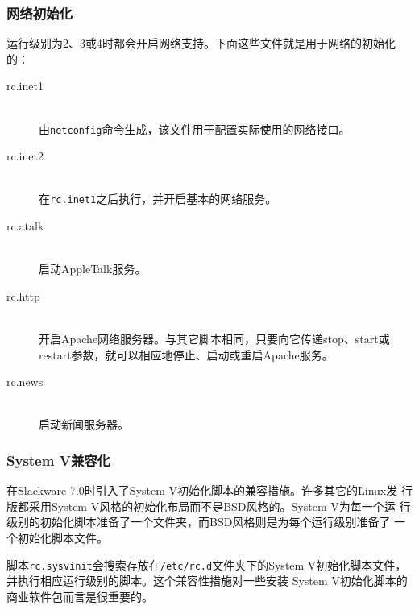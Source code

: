 \subsubsection{网络初始化}
\label{sec:systemConfig:systemOverview:etcRcd:runlevelInit}

运行级别为2、3或4时都会开启网络支持。下面这些文件就是用于网络的初始化
的：

\begin{description}
\item[rc.inet1] \hfill \\
  由\texttt{netconfig}命令生成，该文件用于配置实际使用的网络接口。
\item[rc.inet2] \hfill \\
  在\texttt{rc.inet1}之后执行，并开启基本的网络服务。
\item[rc.atalk] \hfill \\
  启动AppleTalk服务。
\item[rc.http] \hfill \\
  开启Apache网络服务器。与其它脚本相同，只要向它传递stop、start或
  restart参数，就可以相应地停止、启动或重启Apache服务。
\item[rc.news] \hfill \\
  启动新闻服务器。
\end{description}


\subsubsection{System V兼容化}
\label{sec:systemConfig:systemOverview:etcRcd:systemVCompatibilily}

在Slackware 7.0时引入了System V初始化脚本的兼容措施。许多其它的Linux发
行版都采用System V风格的初始化布局而不是BSD风格的。System V为每一个运
行级别的初始化脚本准备了一个文件夹，而BSD风格则是为每个运行级别准备了
一个初始化脚本文件。

脚本\texttt{rc.sysvinit}会搜索存放在\texttt{/etc/rc.d}文件夹下的System
V初始化脚本文件，并执行相应运行级别的脚本。这个兼容性措施对一些安装
System V初始化脚本的商业软件包而言是很重要的。

